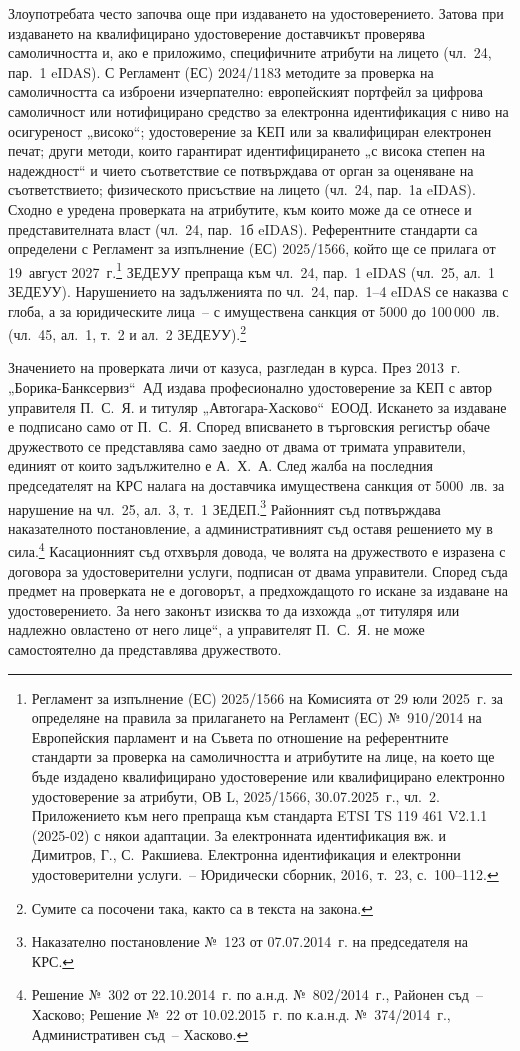 Злоупотребата често започва още при издаването на удостоверението. Затова при издаването
на квалифицирано удостоверение доставчикът проверява самоличността и, ако е приложимо,
специфичните атрибути на лицето (чл.~24, пар.~1 eIDAS). С Регламент (ЕС) 2024/1183 методите
за проверка на самоличността са изброени изчерпателно: европейският портфейл за цифрова
самоличност или нотифицирано средство за електронна идентификация с ниво на осигуреност
„високо“; удостоверение за КЕП или за квалифициран електронен печат; други методи, които
гарантират идентифицирането „с висока степен на надеждност“ и чието съответствие се
потвърждава от орган за оценяване на съответствието; физическото присъствие на лицето
(чл.~24, пар.~1а eIDAS). Сходно е уредена проверката на атрибутите, към които може да се
отнесе и представителната власт (чл.~24, пар.~1б eIDAS). Референтните стандарти са определени с
Регламент за изпълнение (ЕС) 2025/1566, който ще се прилага от 19~август
2027~г.\footnote{Регламент за изпълнение (ЕС) 2025/1566 на Комисията от 29 юли 2025~г. за
определяне на правила за прилагането на Регламент (ЕС) №~910/2014 на Европейския
парламент и на Съвета по отношение на референтните стандарти за проверка на самоличността
и атрибутите на лице, на което ще бъде издадено квалифицирано удостоверение или
квалифицирано електронно удостоверение за атрибути, ОВ L, 2025/1566, 30.07.2025~г.,
чл.~2. Приложението към него препраща към стандарта ETSI TS 119 461 V2.1.1 (2025-02) с
някои адаптации. За
електронната идентификация вж. и Димитров, Г., С.~Ракшиева. Електронна идентификация и
електронни удостоверителни услуги.~-- Юридически сборник, 2016, т.~23, с.~100--112.}
ЗЕДЕУУ препраща към чл.~24, пар.~1 eIDAS (чл.~25, ал.~1 ЗЕДЕУУ). Нарушението на
задълженията по чл.~24, пар.~1--4 eIDAS се наказва с глоба, а за юридическите лица~-- с
имуществена санкция от 5000 до 100\,000~лв. (чл.~45, ал.~1, т.~2 и ал.~2
ЗЕДЕУУ).\footnote{Сумите са посочени така, както са в текста на закона.}

Значението на проверката личи от казуса, разгледан в курса. През 2013~г.
„Борика-Банксервиз“~АД издава професионално удостоверение за КЕП с автор управителя
П.~С.~Я. и титуляр „Автогара-Хасково“~ЕООД. Искането за издаване е подписано само от
П.~С.~Я. Според вписването в търговския регистър обаче дружеството се представлява само
заедно от двама от тримата управители, единият от които задължително е А.~Х.~А. След
жалба на последния председателят на КРС налага на доставчика имуществена санкция от
5000~лв. за нарушение на чл.~25, ал.~3, т.~1 ЗЕДЕП.\footnote{Наказателно постановление
№~123 от 07.07.2014~г. на председателя на КРС.} Районният съд потвърждава наказателното
постановление, а административният съд оставя решението му в сила.\footnote{Решение
№~302 от 22.10.2014~г. по а.н.д. №~802/2014~г., Районен съд~-- Хасково; Решение №~22 от
10.02.2015~г. по к.а.н.д. №~374/2014~г., Административен съд~-- Хасково.} Касационният съд
отхвърля довода, че волята на дружеството е изразена с договора за удостоверителни услуги,
подписан от двама управители. Според съда предмет на проверката не е договорът, а
предхождащото го искане за издаване на удостоверението. За него законът изисква то да
изхожда „от титуляря или надлежно овластено от него лице“, а управителят П.~С.~Я. не може
самостоятелно да представлява дружеството.

